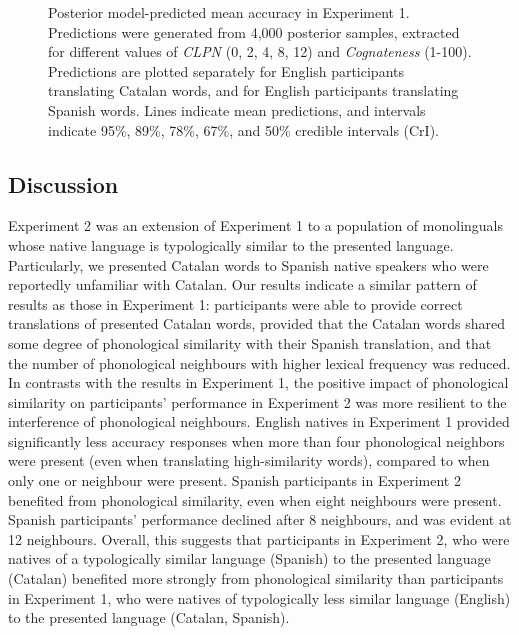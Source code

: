 \documentclass[
]{article}
\begin{document}
\begin{figure}


\caption{\label{fig-epreds-2}Posterior model-predicted mean accuracy in
Experiment 1. Predictions were generated from 4,000 posterior samples,
extracted for different values of \emph{CLPN} (0, 2, 4, 8, 12) and
\emph{Cognateness} (1-100). Predictions are plotted separately for
English participants translating Catalan words, and for English
participants translating Spanish words. Lines indicate mean predictions,
and intervals indicate 95\%, 89\%, 78\%, 67\%, and 50\% credible
intervals (CrI).}

\end{figure}%

\subsection{Discussion}\label{discussion-1}

Experiment 2 was an extension of Experiment 1 to a population of
monolinguals whose native language is typologically similar to the
presented language. Particularly, we presented Catalan words to Spanish
native speakers who were reportedly unfamiliar with Catalan. Our results
indicate a similar pattern of results as those in Experiment 1:
participants were able to provide correct translations of presented
Catalan words, provided that the Catalan words shared some degree of
phonological similarity with their Spanish translation, and that the
number of phonological neighbours with higher lexical frequency was
reduced. In contrasts with the results in Experiment 1, the positive
impact of phonological similarity on participants' performance in
Experiment 2 was more resilient to the interference of phonological
neighbours. English natives in Experiment 1 provided significantly less
accuracy responses when more than four phonological neighbors were
present (even when translating high-similarity words), compared to when
only one or neighbour were present. Spanish participants in Experiment 2
benefited from phonological similarity, even when eight neighbours were
present. Spanish participants' performance declined after 8 neighbours,
and was evident at 12 neighbours. Overall, this suggests that
participants in Experiment 2, who were natives of a typologically
similar language (Spanish) to the presented language (Catalan) benefited
more strongly from phonological similarity than participants in
Experiment 1, who were natives of typologically less similar language
(English) to the presented language (Catalan, Spanish).
\end{document}
